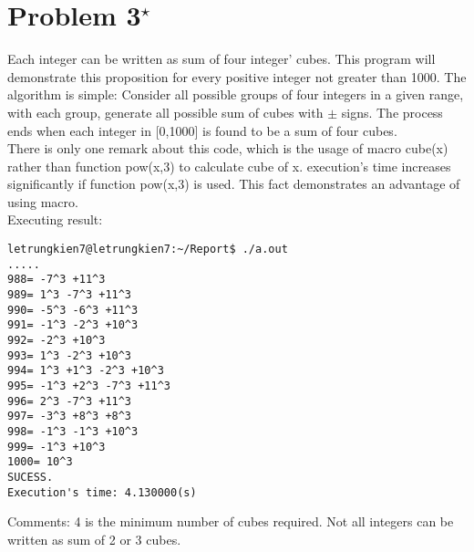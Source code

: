 \documentclass[11pt]{article}
\begin{document}
\section{Problem 3${}^{\star}$}
\indent Each integer can be written as sum of four integer' cubes. This program will demonstrate this proposition for every positive integer not greater than 1000. The algorithm is simple: Consider all possible groups of four integers in a given range, with each group, generate all possible sum of cubes with $\pm$ signs. The process ends when each integer in [0,1000] is found to be a sum of four cubes. \\
\indent There is only one remark about this code, which is the usage of macro cube(x) rather than function pow(x,3) to calculate cube of x. execution's time increases significantly if function pow(x,3) is used. This fact demonstrates an advantage of using macro. \\
Executing result:
\begin{verbatim}
letrungkien7@letrungkien7:~/Report$ ./a.out
.....
988= -7^3 +11^3 
989= 1^3 -7^3 +11^3 
990= -5^3 -6^3 +11^3 
991= -1^3 -2^3 +10^3 
992= -2^3 +10^3 
993= 1^3 -2^3 +10^3 
994= 1^3 +1^3 -2^3 +10^3 
995= -1^3 +2^3 -7^3 +11^3 
996= 2^3 -7^3 +11^3 
997= -3^3 +8^3 +8^3 
998= -1^3 -1^3 +10^3 
999= -1^3 +10^3 
1000= 10^3 
SUCESS.
Execution's time: 4.130000(s)
\end{verbatim}
Comments: 4 is the minimum number of cubes required. Not all integers can be written as sum of 2 or 3 cubes.
\newpage
\end{document}
